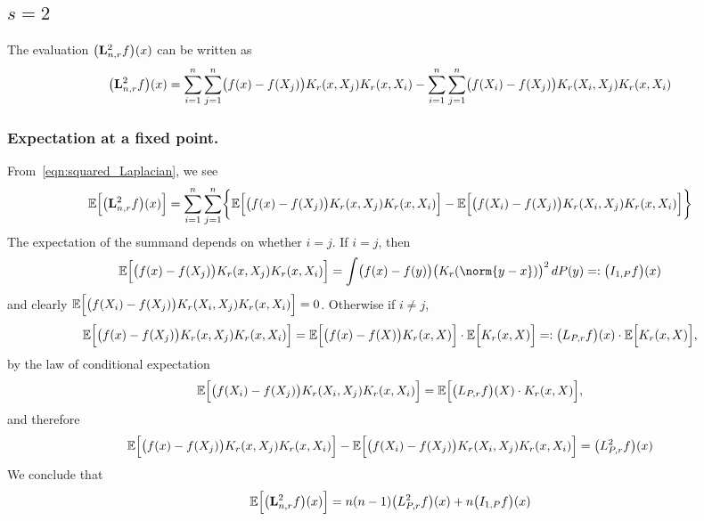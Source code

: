 \documentclass{article}
\newcommand{\1}{\mathbf{1}}
\newcommand{\Lap}{{\bf L}}
\newcommand{\Ebb}{\mathbb{E}}
\theoremstyle{alden}
\theoremstyle{aldenthm}
\theoremstyle{definition}
\theoremstyle{remark}
\begin{document}
\subsection{$s = 2$}

The evaluation $\bigl(\Lap_{n,r}^2 f\bigr)(x)$ can be written as
\begin{equation}
\label{eqn:squared_Laplacian}
\bigl(\Lap_{n,r}^2 f\bigr)(x) = \sum_{i = 1}^{n} \sum_{j = 1}^{n} \bigl(f(x) - f(X_j)\bigr)K_r(x,X_j)K_r(x,X_i) - \sum_{i = 1}^{n} \sum_{j = 1}^{n} \bigl(f(X_i) - f(X_j)\bigr)K_r(X_i,X_j)K_r(x,X_i)
\end{equation}
\subsubsection{Expectation at a fixed point.}
From~\eqref{eqn:squared_Laplacian}, we see
\begin{equation*}
\Ebb\Bigl[\bigl(\Lap_{n,r}^2 f\bigr)(x)\Bigr] = \sum_{i = 1}^{n} \sum_{j = 1}^{n} \biggl\{\Ebb\Bigl[\bigl(f(x) - f(X_j)\bigr)K_r(x,X_j)K_r(x,X_i)\Bigr] - \Ebb\Bigl[\bigl(f(X_i) - f(X_j)\bigr)K_r(X_i,X_j)K_r(x,X_i)\Bigr]\biggr\}
\end{equation*}
The expectation of the summand depends on whether $i = j$. If $i = j$, then 
\begin{equation*}
\Ebb\Bigl[\bigl(f(x) - f(X_j)\bigr)K_r(x,X_j)K_r(x,X_i)\Bigr] = \int \bigl(f(x) - f(y)\bigr) \bigl(K_r(\norm{y - x})\bigr)^2 \,dP(y) =: \bigl(I_{1,P}f\bigr)(x)
\end{equation*}
and clearly $\Ebb\Bigl[\bigl(f(X_i) - f(X_j)\bigr)K_r(X_i,X_j)K_r(x,X_i)\Bigr] = 0$. Otherwise if $i \neq j$,
\begin{equation*}
\Ebb\Bigl[\bigl(f(x) - f(X_j)\bigr)K_r(x,X_j)K_r(x,X_i)\Bigr] = \Ebb \Bigl[\bigl(f(x) - f(X)\bigr)K_r(x,X)\Bigr] \cdot \Ebb\Bigl[K_r(x,X)\Bigr] =: \bigl(L_{P,r}f\bigr)(x) \cdot \Ebb\Bigl[K_r(x,X)\Bigr],
\end{equation*}
by the law of conditional expectation
\begin{equation*}
\Ebb\Bigl[\bigl(f(X_i) - f(X_j)\bigr)K_r(X_i,X_j)K_r(x,X_i)\Bigr] = \Ebb\Bigl[\bigl(L_{P,r}f\bigr)(X) \cdot K_r(x,X)\Bigr],
\end{equation*}
and therefore
\begin{equation*}
\Ebb\Bigl[\bigl(f(x) - f(X_j)\bigr)K_r(x,X_j)K_r(x,X_i)\Bigr] -\Ebb\Bigl[\bigl(f(X_i) - f(X_j)\bigr)K_r(X_i,X_j)K_r(x,X_i)\Bigr] = \bigl(L_{P,r}^2f\bigr)(x)
\end{equation*}
We conclude that
\begin{equation*}
\Ebb\Bigl[\bigl(\Lap_{n,r}^2 f\bigr)(x)\Bigr] = n(n - 1) \bigl(L_{P,r}^2f\bigr)(x) + n \bigl(I_{1,P}f\bigr)(x)
\end{equation*}
\end{document}

